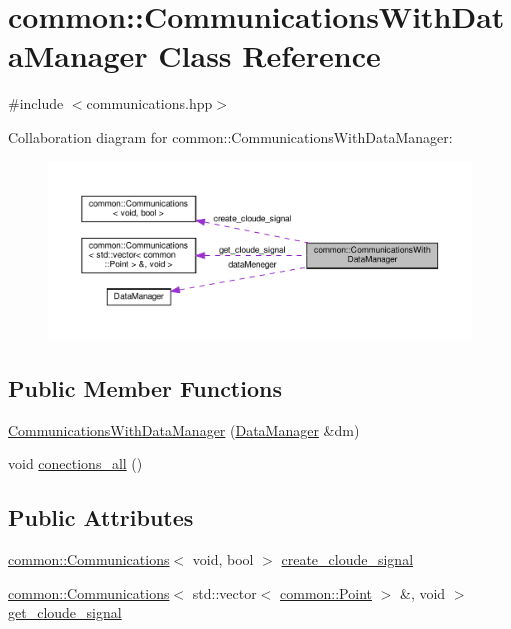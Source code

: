 \hypertarget{classcommon_1_1CommunicationsWithDataManager}{}\section{common\+:\+:Communications\+With\+Data\+Manager Class Reference}
\label{classcommon_1_1CommunicationsWithDataManager}


{\ttfamily \#include $<$communications.\+hpp$>$}



Collaboration diagram for common\+:\+:Communications\+With\+Data\+Manager\+:
\nopagebreak
\begin{figure}[H]
\begin{center}
\leavevmode
\includegraphics[width=350pt]{classcommon_1_1CommunicationsWithDataManager__coll__graph}
\end{center}
\end{figure}
\subsection*{Public Member Functions}
\begin{DoxyCompactItemize}
\item 
\mbox{\hyperlink{classcommon_1_1CommunicationsWithDataManager_a95252afb06dc08a2ab89e3c7fe0b8733}{Communications\+With\+Data\+Manager}} (\mbox{\hyperlink{classDataManager}{Data\+Manager}} \&dm)
\item 
void \mbox{\hyperlink{classcommon_1_1CommunicationsWithDataManager_af065d105c9e14c175a07c2034b1441de}{conections\+\_\+all}} ()
\end{DoxyCompactItemize}
\subsection*{Public Attributes}
\begin{DoxyCompactItemize}
\item 
\mbox{\hyperlink{classcommon_1_1Communications}{common\+::\+Communications}}$<$ void, bool $>$ \mbox{\hyperlink{classcommon_1_1CommunicationsWithDataManager_a228466f92772aa4a499d42d74e44fa3f}{create\+\_\+cloude\+\_\+signal}}
\item 
\mbox{\hyperlink{classcommon_1_1Communications}{common\+::\+Communications}}$<$ std\+::vector$<$ \mbox{\hyperlink{structcommon_1_1Point}{common\+::\+Point}} $>$ \&, void $>$ \mbox{\hyperlink{classcommon_1_1CommunicationsWithDataManager_a37a1acf86b9b1107e0a3686287980464}{get\+\_\+cloude\+\_\+signal}}
\end{DoxyCompactItemize}
